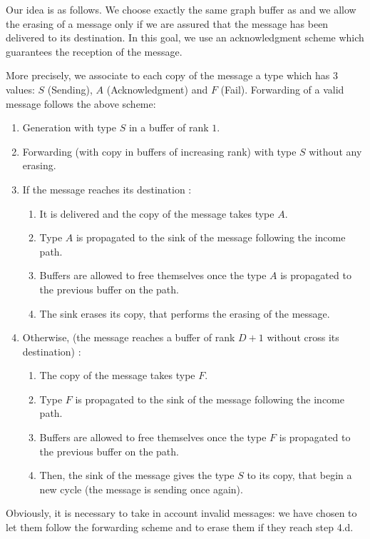 \documentclass[11pt]{article}
\begin{document}
Our idea is as follows. We choose exactly the same graph buffer as \cite{MS78} and we allow the erasing of a message only if we are assured that the message has been delivered to its destination. In this goal, we use an acknowledgment scheme which guarantees the reception of the message.

More precisely, we associate to each copy of the message a type which has 3 values: $S$ (Sending), $A$ (Acknowledgment) and $F$ (Fail). Forwarding of a valid message follows the above scheme:

\begin{enumerate}
\item Generation with type $S$ in a buffer of rank $1$.
\item Forwarding (with copy in buffers of increasing rank) with type $S$ without any erasing.
\item If the message reaches its destination :
\begin{enumerate}
\item It is delivered and the copy of the message takes type $A$.
\item Type $A$ is propagated to the sink of the message following the income path.
\item Buffers are allowed to free themselves once the type $A$ is propagated to the previous buffer on the path.
\item The sink erases its copy, that performs the erasing of the message.
\end{enumerate}
\item Otherwise, (the message reaches a buffer of rank $D+1$ without cross its destination) :
\begin{enumerate}
\item The copy of the message takes type $F$.
\item Type $F$ is propagated to the sink of the message following the income path.
\item Buffers are allowed to free themselves once the type $F$ is propagated to the previous buffer on the path.
\item Then, the sink of the message gives the type $S$ to its copy, that begin a new cycle (the message is sending once again).
\end{enumerate}
\end{enumerate}

Obviously, it is necessary to take in account invalid messages: we have chosen to let them follow the forwarding scheme and to erase them if they reach step 4.d.
\end{document}
